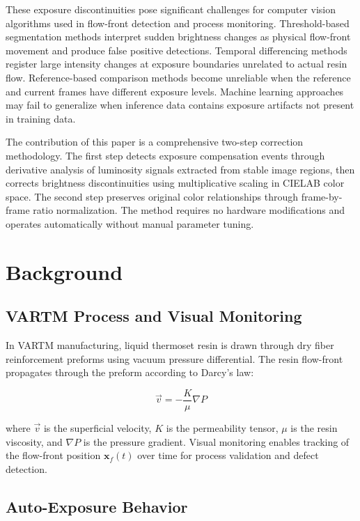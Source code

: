 \documentclass[conference]{IEEEtran}
\begin{document}
These exposure discontinuities pose significant challenges for computer vision algorithms used in flow-front detection and process monitoring. Threshold-based segmentation methods interpret sudden brightness changes as physical flow-front movement and produce false positive detections. Temporal differencing methods register large intensity changes at exposure boundaries unrelated to actual resin flow. Reference-based comparison methods become unreliable when the reference and current frames have different exposure levels. Machine learning approaches may fail to generalize when inference data contains exposure artifacts not present in training data.

The contribution of this paper is a comprehensive two-step correction methodology. The first step detects exposure compensation events through derivative analysis of luminosity signals extracted from stable image regions, then corrects brightness discontinuities using multiplicative scaling in CIELAB color space. The second step preserves original color relationships through frame-by-frame ratio normalization. The method requires no hardware modifications and operates automatically without manual parameter tuning.

\section{Background}
\label{sec:background}

\subsection{VARTM Process and Visual Monitoring}

In VARTM manufacturing, liquid thermoset resin is drawn through dry fiber reinforcement preforms using vacuum pressure differential. The resin flow-front propagates through the preform according to Darcy's law:

\begin{equation}
\vec{v} = -\frac{K}{\mu} \nabla P
\label{eq:darcy}
\end{equation}

where $\vec{v}$ is the superficial velocity, $K$ is the permeability tensor, $\mu$ is the resin viscosity, and $\nabla P$ is the pressure gradient. Visual monitoring enables tracking of the flow-front position $\mathbf{x}_f(t)$ over time for process validation and defect detection.

\subsection{Auto-Exposure Behavior}
\end{document}
